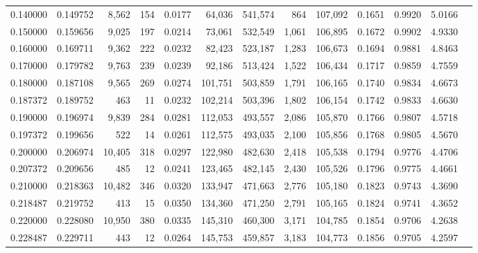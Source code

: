 \begin{tabular}{rrrrrrrrrrrrr}
0.140000 & 0.149752 &  8,562 &   154 &                                     0.0177 &  64,036 & 541,574 &     864 & 107,092 & 0.1651 & 0.9920 & 5.0166 \\
0.150000 & 0.159656 &  9,025 &   197 &                                     0.0214 &  73,061 & 532,549 &   1,061 & 106,895 & 0.1672 & 0.9902 & 4.9330 \\
0.160000 & 0.169711 &  9,362 &   222 &                                     0.0232 &  82,423 & 523,187 &   1,283 & 106,673 & 0.1694 & 0.9881 & 4.8463 \\
0.170000 & 0.179782 &  9,763 &   239 &                                     0.0239 &  92,186 & 513,424 &   1,522 & 106,434 & 0.1717 & 0.9859 & 4.7559 \\
0.180000 & 0.187108 &  9,565 &   269 &                                     0.0274 & 101,751 & 503,859 &   1,791 & 106,165 & 0.1740 & 0.9834 & 4.6673 \\
0.187372 & 0.189752 &    463 &    11 &                                     0.0232 & 102,214 & 503,396 &   1,802 & 106,154 & 0.1742 & 0.9833 & 4.6630 \\
0.190000 & 0.196974 &  9,839 &   284 &                                     0.0281 & 112,053 & 493,557 &   2,086 & 105,870 & 0.1766 & 0.9807 & 4.5718 \\
0.197372 & 0.199656 &    522 &    14 &                                     0.0261 & 112,575 & 493,035 &   2,100 & 105,856 & 0.1768 & 0.9805 & 4.5670 \\
0.200000 & 0.206974 & 10,405 &   318 &                                     0.0297 & 122,980 & 482,630 &   2,418 & 105,538 & 0.1794 & 0.9776 & 4.4706 \\
0.207372 & 0.209656 &    485 &    12 &                                     0.0241 & 123,465 & 482,145 &   2,430 & 105,526 & 0.1796 & 0.9775 & 4.4661 \\
0.210000 & 0.218363 & 10,482 &   346 &                                     0.0320 & 133,947 & 471,663 &   2,776 & 105,180 & 0.1823 & 0.9743 & 4.3690 \\
0.218487 & 0.219752 &    413 &    15 &                                     0.0350 & 134,360 & 471,250 &   2,791 & 105,165 & 0.1824 & 0.9741 & 4.3652 \\
0.220000 & 0.228080 & 10,950 &   380 &                                     0.0335 & 145,310 & 460,300 &   3,171 & 104,785 & 0.1854 & 0.9706 & 4.2638 \\
0.228487 & 0.229711 &    443 &    12 &                                     0.0264 & 145,753 & 459,857 &   3,183 & 104,773 & 0.1856 & 0.9705 & 4.2597 \\

\end{tabular}
